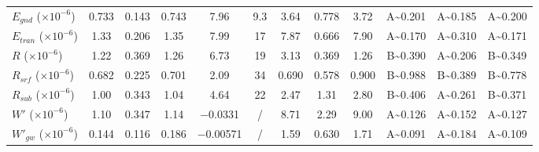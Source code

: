 \documentclass[essd, manuscript]{copernicus}
\begin{document}
\begin{table}[t]
\begin{tabular}{lccccccccccc}
    \(E_{gnd}\) (\(\times 10^{-6}\))    & \num{0.733}                                            & \num{0.143}                                             & \num{0.743}                & \num{7.96}     & \num{9.3} & \num{3.64}  & \num{0.778} & \num{3.72}  & A\textasciitilde\num{0.201} & A\textasciitilde\num{0.185} & A\textasciitilde\num{0.200} \\
    \(E_{tran}\) (\(\times 10^{-6}\))   & \num{1.33}                                             & \num{0.206}                                             & \num{1.35}                 & \num{7.99}     & \num{17}  & \num{7.87}  & \num{0.666} & \num{7.90}  & A\textasciitilde\num{0.170} & A\textasciitilde\num{0.310} & A\textasciitilde\num{0.171} \\
    \(R\) (\(\times 10^{-6}\))          & \num{1.22}                                             & \num{0.369}                                             & \num{1.26}                 & \num{6.73}     & \num{19}  & \num{3.13}  & \num{0.369} & \num{1.26}  & B\textasciitilde\num{0.390} & A\textasciitilde\num{0.206} & B\textasciitilde\num{0.349} \\
    \(R_{srf}\) (\(\times 10^{-6}\))    & \num{0.682}                                            & \num{0.225}                                             & \num{0.701}                & \num{2.09}     & \num{34}  & \num{0.690} & \num{0.578} & \num{0.900} & B\textasciitilde\num{0.988} & B\textasciitilde\num{0.389} & B\textasciitilde\num{0.778} \\
    \(R_{sub}\) (\(\times 10^{-6}\))    & \num{1.00}                                             & \num{0.343}                                             & \num{1.04}                 & \num{4.64}     & \num{22}  & \num{2.47}  & \num{1.31}  & \num{2.80}  & B\textasciitilde\num{0.406} & A\textasciitilde\num{0.261} & B\textasciitilde\num{0.371} \\
    \(W'\) (\(\times 10^{-6}\))         & \num{1.10}                                             & \num{0.347}                                             & \num{1.14}                 & \num{-0.0331}  & /         & \num{8.71}  & \num{2.29}  & \num{9.00}  & A\textasciitilde\num{0.126} & A\textasciitilde\num{0.152} & A\textasciitilde\num{0.127} \\
    \(W'_{gw}\) (\(\times 10^{-6}\))    & \num{0.144}                                            & \num{0.116}                                             & \num{0.186}                & \num{-0.00571} & /         & \num{1.59}  & \num{0.630} & \num{1.71}  & A\textasciitilde\num{0.091} & A\textasciitilde\num{0.184} & A\textasciitilde\num{0.109} \\

\end{tabular}
\end{table}
\end{document}
